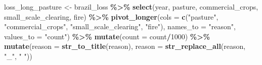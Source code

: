 \documentclass[
]{article}
\newenvironment{Shaded}{\begin{snugshade}}{\end{snugshade}}
\newcommand{\DataTypeTok}[1]{\textcolor[rgb]{0.13,0.29,0.53}{#1}}
\newcommand{\DecValTok}[1]{\textcolor[rgb]{0.00,0.00,0.81}{#1}}
\newcommand{\KeywordTok}[1]{\textcolor[rgb]{0.13,0.29,0.53}{\textbf{#1}}}
\newcommand{\NormalTok}[1]{#1}
\newcommand{\OperatorTok}[1]{\textcolor[rgb]{0.81,0.36,0.00}{\textbf{#1}}}
\newcommand{\StringTok}[1]{\textcolor[rgb]{0.31,0.60,0.02}{#1}}
\begin{document}
\begin{Shaded}
\begin{Highlighting}[]
\NormalTok{loss\_long\_pasture \textless{}{-}}\StringTok{ }\NormalTok{brazil\_loss }\OperatorTok{\%\textgreater{}\%}\StringTok{ }
\StringTok{  }\KeywordTok{select}\NormalTok{(year, pasture, commercial\_crops, small\_scale\_clearing, fire) }\OperatorTok{\%\textgreater{}\%}
\StringTok{  }\KeywordTok{pivot\_longer}\NormalTok{(}\DataTypeTok{cols =} \KeywordTok{c}\NormalTok{(}\StringTok{"pasture"}\NormalTok{, }\StringTok{"commercial\_crops"}\NormalTok{, }\StringTok{"small\_scale\_clearing"}\NormalTok{, }\StringTok{"fire"}\NormalTok{), }
               \DataTypeTok{names\_to =} \StringTok{"reason"}\NormalTok{, }
               \DataTypeTok{values\_to =} \StringTok{"count"}\NormalTok{) }\OperatorTok{\%\textgreater{}\%}
\StringTok{  }\KeywordTok{mutate}\NormalTok{(}\DataTypeTok{count =}\NormalTok{ count}\OperatorTok{/}\DecValTok{1000}\NormalTok{) }\OperatorTok{\%\textgreater{}\%}
\StringTok{  }\KeywordTok{mutate}\NormalTok{(}\DataTypeTok{reason =} \KeywordTok{str\_to\_title}\NormalTok{(reason),}
         \DataTypeTok{reason =} \KeywordTok{str\_replace\_all}\NormalTok{(reason, }\StringTok{"\_"}\NormalTok{, }\StringTok{" "}\NormalTok{))}


\end{Highlighting}
\end{Shaded}
\end{document}
